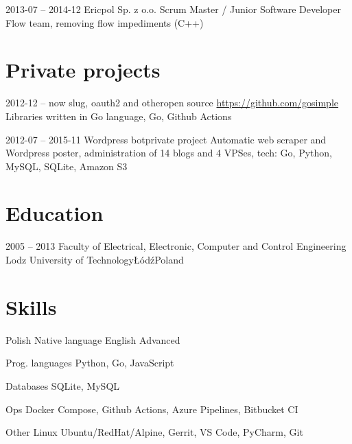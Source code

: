 \documentclass[11pt,a4paper,sans,english]{moderncv}   %
\begin{document}
\cventry
{\small2013-07 -- 2014-12}
	{Ericpol Sp. z o.o.}{}{}
	{Scrum Master / Junior Software Developer}
	{Flow team, removing flow impediments (C++)}


\vspace{-0.3cm}

\section{Private projects}

\cventry
{\small2012-12 -- now}
	{slug, oauth2 and other}{open source}{}
	{\url{https://github.com/gosimple}}
	{Libraries written in Go language, Go, Github Actions}

\cventry
{\small2012-07 -- 2015-11}
	{Wordpress bot}{private project}{}
	{}
	{Automatic web scraper and Wordpress poster,
		administration of 14 blogs and 4 VPSes, tech:
		Go, Python, MySQL, SQLite, Amazon S3}


\vspace{-0.3cm}

\section{Education}

\cventry
{\small2005 -- 2013}
	{Faculty of Electrical, Electronic, Computer and Control Engineering}
	{Lodz University of Technology}{Łódź}{Poland}{}

\vspace{-0.2cm}



\vspace{-0.3cm}

\section{Skills}


\cvitemwithcomment
	{Polish}
	{Native language}{}
\cvitemwithcomment
	{English}
	{Advanced}{}

\cvitemwithcomment
	{\small{Prog. languages}}
	{Python, Go, JavaScript}{}

\cvitemwithcomment
	{\small{Databases}}
	{SQLite, MySQL}{}

\cvitemwithcomment
	{\small{Ops}}
	{Docker Compose, Github Actions, Azure Pipelines, Bitbucket CI}{}

\cvitemwithcomment
	{\small{Other}}
	{\small{Linux Ubuntu/RedHat/Alpine, Gerrit, VS Code, PyCharm, Git}}{}
\end{document}
